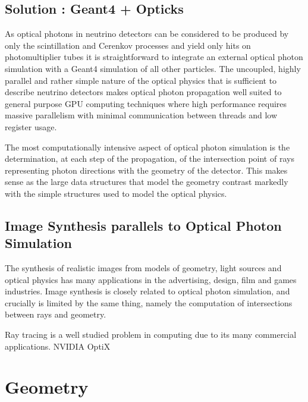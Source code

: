 \documentclass[a4paper]{jpconf}
\begin{document}
\subsection{Solution : Geant4 + Opticks}

As optical photons in neutrino detectors can be considered to be produced 
by only the scintillation and Cerenkov processes and yield only hits 
on photomultiplier tubes it is straightforward to integrate an
external optical photon simulation with a Geant4 simulation of all other particles.
%
The uncoupled, highly parallel and rather simple nature of the optical physics 
that is sufficient to describe neutrino detectors makes optical photon propagation 
well suited to general purpose GPU computing techniques where
high performance requires massive parallelism with minimal communication between threads
and low register usage.  

The most computationally intensive aspect of optical photon simulation
is the determination, at each step of the propagation, of the intersection point 
of rays representing photon directions with the geometry of the detector. This 
makes sense as the large data structures that model the geometry contrast
markedly with the simple structures used to model the optical physics.


\subsection{Image Synthesis parallels to Optical Photon Simulation} 

The synthesis of realistic images from models of geometry, 
light sources and optical physics has many applications in 
the advertising, design, film and games industries. 
Image synthesis is closely related to optical photon simulation, 
and crucially is limited by the same thing, namely the 
computation of intersections between rays and geometry.  

Ray tracing is a well studied problem in computing due to its many commercial 
applications. NVIDIA OptiX\cite{optixPaper}\cite{optixSite} 




\section{Geometry}


\end{document}
